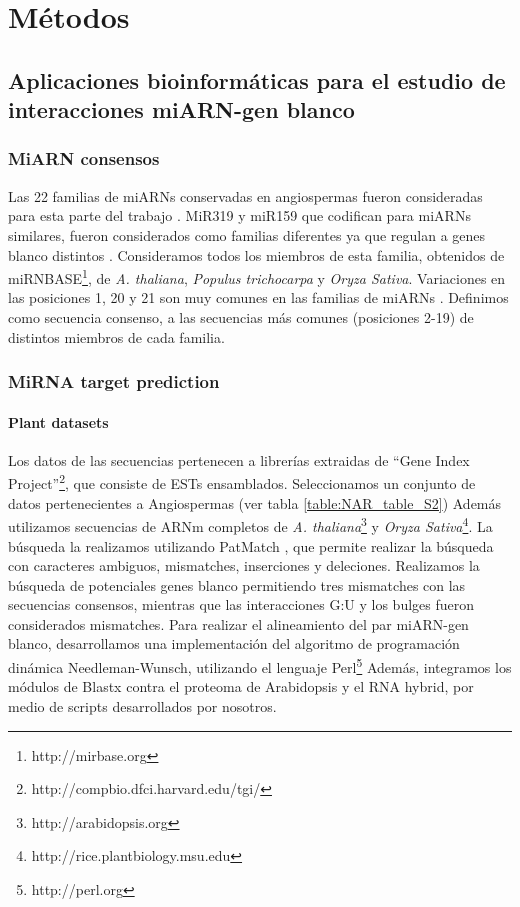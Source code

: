\chapter{Métodos} 

\section{Aplicaciones bioinformáticas para el estudio de interacciones miARN-gen blanco}

\subsection{MiARN consensos}
Las 22 familias de miARNs conservadas en angiospermas fueron consideradas para esta parte del trabajo \citep{14,30}.
MiR319 y miR159 que codifican para miARNs similares, fueron considerados como familias diferentes ya que regulan a genes blanco distintos \citep{33}.
Consideramos todos los miembros de esta familia, obtenidos de miRNBASE\footnote{http://mirbase.org}, de \textit{A. thaliana}, \textit{Populus trichocarpa} y \textit{Oryza Sativa}.
Variaciones en las posiciones 1, 20 y 21 son muy comunes en las familias de miARNs \citep{32}.
Definimos como secuencia consenso, a las secuencias más comunes (posiciones 2-19) de distintos miembros de cada familia.

\subsection{MiRNA target prediction}
\subsubsection{Plant datasets}
Los datos de las secuencias pertenecen a librerías extraidas de “Gene Index Project”\footnote{http://compbio.dfci.harvard.edu/tgi/}, que consiste de ESTs ensamblados.
Seleccionamos un conjunto de datos pertenecientes a Angiospermas (ver tabla \ref{table:NAR_table_S2})
Además utilizamos secuencias de ARNm completos de \textit{A. thaliana}\footnote{http://arabidopsis.org} y \textit{Oryza Sativa}\footnote{http://rice.plantbiology.msu.edu}.
La búsqueda la realizamos utilizando PatMatch \citep{34}, que permite realizar la búsqueda con caracteres ambiguos, mismatches, inserciones y deleciones.
Realizamos la búsqueda de potenciales genes blanco permitiendo tres mismatches con las secuencias consensos, mientras que las interacciones G:U y los bulges fueron considerados mismatches.
Para realizar el alineamiento del par miARN-gen blanco, desarrollamos una implementación del algoritmo de programación dinámica Needleman-Wunsch\citep{35}, utilizando el lenguaje Perl\footnote{http://perl.org}
Además, integramos los módulos de Blastx\citep{36} contra el proteoma de Arabidopsis y el RNA hybrid\citep{37}, por medio de scripts desarrollados por nosotros.

